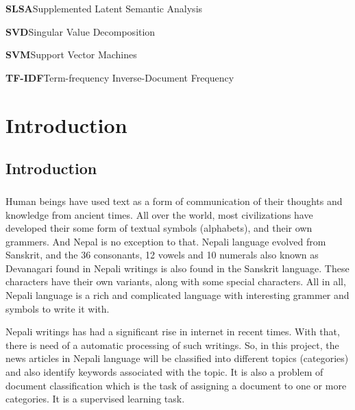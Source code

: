 \documentclass[12pt]{report}
\begin{document}
    \hspace{25pt}\textbf{SLSA}\hspace{152pt}Supplemented Latent Semantic Analysis



    \hspace{25pt}\textbf{SVD}\hspace{158pt}Singular Value Decomposition



    \hspace{25pt}\textbf{SVM}\hspace{156pt}Support Vector Machines




    \hspace{25pt}\textbf{TF-IDF}\hspace{143pt}Term-frequency Inverse-Document Frequency



    \newpage
    \listoffigures






    \newpage
    \chapter{Introduction}

    \section{Introduction}
    \paragraph{}
        Human beings have used text as a form of communication of their thoughts and knowledge from ancient times. All over the world, most civilizations have developed their some form of textual symbols
        (alphabets), and  their own grammers.
        And Nepal is no exception to that. Nepali language evolved from Sanskrit, and the 36 consonants, 12 vowels and 10 numerals also known as Devanagari found in Nepali writings is also found
        in the Sanskrit language.
        These characters have their own variants, along with some special characters. All in all, Nepali language is a rich and complicated language with interesting grammer and symbols to write it with.

        Nepali writings has had a significant rise in internet in recent times. With that, there is need of a automatic processing of such writings.
        So, in this project, the news articles in Nepali language will be classified into different topics (categories) and also identify keywords associated with the topic.
        It is also a problem of document classification which is the task of assigning a document to one or more categories. It is a supervised learning task.
\end{document}
